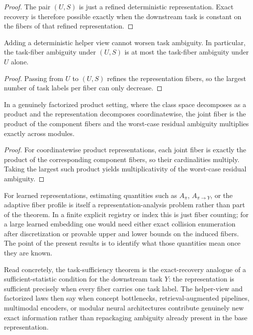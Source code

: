 \begin{proof}
The pair $(U,S)$ is just a refined deterministic representation. Exact recovery is therefore possible exactly when the downstream task is constant on the fibers of that refined representation.
\end{proof}

\begin{corollary}\label{cor:helper-view-mono}
Adding a deterministic helper view cannot worsen task ambiguity. In particular, the task-fiber ambiguity under $(U,S)$ is at most the task-fiber ambiguity under $U$ alone.
\end{corollary}

\begin{proof}
Passing from $U$ to $(U,S)$ refines the representation fibers, so the largest number of task labels per fiber can only decrease.
\end{proof}

\begin{corollary}\label{cor:factorized-product-law}
In a genuinely factorized product setting, where the class space decomposes as a product and the representation decomposes coordinatewise, the joint fiber is the product of the component fibers and the worst-case residual ambiguity multiplies exactly across modules.
\end{corollary}

\begin{proof}
For coordinatewise product representations, each joint fiber is exactly the product of the corresponding component fibers, so their cardinalities multiply. Taking the largest such product yields multiplicativity of the worst-case residual ambiguity.
\end{proof}

For learned representations, estimating quantities such as $A_\pi$, $A_{\pi \to Y}$, or the adaptive fiber profile is itself a representation-analysis problem rather than part of the theorem. In a finite explicit registry or index this is just fiber counting; for a large learned embedding one would need either exact collision enumeration after discretization or provable upper and lower bounds on the induced fibers. The point of the present results is to identify what those quantities mean once they are known.

Read concretely, the task-sufficiency theorem is the exact-recovery analogue of a sufficient-statistic condition for the downstream task $Y$: the representation is sufficient precisely when every fiber carries one task label. The helper-view and factorized laws then say when concept bottlenecks, retrieval-augmented pipelines, multimodal encoders, or modular neural architectures contribute genuinely new exact information rather than repackaging ambiguity already present in the base representation.

